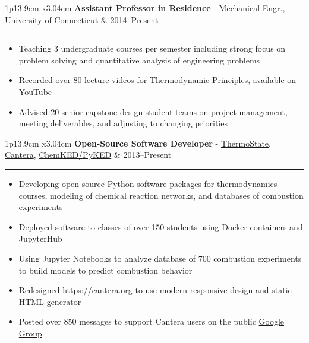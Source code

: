 \documentclass[11pt]{article}
\newenvironment{cvevent}[3]{%
%
\begin{tabular*}{1\textwidth}{p{13.9cm} x{3.04cm}}%
    \textbf{#2} - \textcolor{bgcol}{#3} & \vspace{2.5pt}\textcolor{sectcol}{#1}%
\end{tabular*}%

\vspace{-8pt}%
\textcolor{softcol}{\hrule}%
\vspace{6pt}%
}{
\vspace{6pt}
}
\begin{document}
\begin{cvevent}{2014--Present}%
{Assistant Professor in Residence}%
{Mechanical Engr., University of Connecticut}%
\begin{itemize}
    \item Teaching 3 undergraduate courses per semester including strong focus on problem
    solving and quantitative analysis of engineering problems
    \item Recorded over 80 lecture videos for Thermodynamic Principles, available on
    \href{https://www.youtube.com/playlist?list=PLnOxmF4n89SXsKxFb6ug0ThMNpqJST5_X}{YouTube}
    \item Advised 20 senior capstone design student teams on project management, meeting
    deliverables, and adjusting to changing priorities
\end{itemize}
\end{cvevent}

\begin{cvevent}{2013--Present}
{Open-Source Software Developer}
{\href{https://github.com/bryanwweber/thermostate}{ThermoState},
\href{https://github.com/cantera}{Cantera},
\href{https://github.com/pr-omethe-us/pyked}{ChemKED/PyKED}}
\begin{itemize}
    \item Developing open-source Python software packages for thermodynamics courses,
    modeling of chemical reaction networks, and databases of combustion experiments
    \item Deployed software to classes of over 150 students using Docker containers and
    JupyterHub
    \item Using Jupyter Notebooks to analyze database of 700 combustion experiments to
    build models to predict combustion behavior
    \item Redesigned \url{https://cantera.org} to use modern responsive design and static
    HTML generator
    \item Posted over 850 messages to support Cantera users on the public
    \href{https://groups.google.com/forum/#!forum/cantera-users}{Google Group}
\end{itemize}
\end{cvevent}
\end{document}
